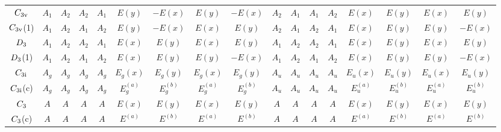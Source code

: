 \documentclass[fleqn,9pt,landscape]{jsarticle}
\begin{document}
\begin{table}[ht!]
\begin{center}
\begin{tabular}{c|cccccccc|cccccccc}
$C_{\rm 3v}$ & $A_{1}$ & $A_{2}$ & $A_{2}$ & $A_{1}$ & $E(y)$ & $-E(x)$ & $E(y)$ & $-E(x)$ & $A_{2}$ & $A_{1}$ & $A_{1}$ & $A_{2}$ & $E(x)$ & $E(y)$ & $E(x)$ & $E(y)$ \\
$C_{\rm 3v}$(1) & $A_{1}$ & $A_{2}$ & $A_{1}$ & $A_{2}$ & $E(y)$ & $-E(x)$ & $E(x)$ & $E(y)$ & $A_{2}$ & $A_{1}$ & $A_{2}$ & $A_{1}$ & $E(x)$ & $E(y)$ & $E(y)$ & $-E(x)$ \\
$D_{\rm 3}$ & $A_{1}$ & $A_{2}$ & $A_{2}$ & $A_{1}$ & $E(x)$ & $E(y)$ & $E(x)$ & $E(y)$ & $A_{1}$ & $A_{2}$ & $A_{2}$ & $A_{1}$ & $E(x)$ & $E(y)$ & $E(x)$ & $E(y)$ \\
$D_{\rm 3}$(1) & $A_{1}$ & $A_{2}$ & $A_{1}$ & $A_{2}$ & $E(x)$ & $E(y)$ & $E(y)$ & $-E(x)$ & $A_{1}$ & $A_{2}$ & $A_{1}$ & $A_{2}$ & $E(x)$ & $E(y)$ & $E(y)$ & $-E(x)$ \\
$C_{\rm 3i}$ & $A_{g}$ & $A_{g}$ & $A_{g}$ & $A_{g}$ & $E_{g}(x)$ & $E_{g}(y)$ & $E_{g}(x)$ & $E_{g}(y)$ & $A_{u}$ & $A_{u}$ & $A_{u}$ & $A_{u}$ & $E_{u}(x)$ & $E_{u}(y)$ & $E_{u}(x)$ & $E_{u}(y)$ \\
$C_{\rm 3i}$(c) & $A_{g}$ & $A_{g}$ & $A_{g}$ & $A_{g}$ & $E_{g}^{(a)}$ & $E_{g}^{(b)}$ & $E_{g}^{(a)}$ & $E_{g}^{(b)}$ & $A_{u}$ & $A_{u}$ & $A_{u}$ & $A_{u}$ & $E_{u}^{(a)}$ & $E_{u}^{(b)}$ & $E_{u}^{(a)}$ & $E_{u}^{(b)}$ \\
$C_{\rm 3}$ & $A$ & $A$ & $A$ & $A$ & $E(x)$ & $E(y)$ & $E(x)$ & $E(y)$ & $A$ & $A$ & $A$ & $A$ & $E(x)$ & $E(y)$ & $E(x)$ & $E(y)$ \\
$C_{\rm 3}$(c) & $A$ & $A$ & $A$ & $A$ & $E^{(a)}$ & $E^{(b)}$ & $E^{(a)}$ & $E^{(b)}$ & $A$ & $A$ & $A$ & $A$ & $E^{(a)}$ & $E^{(b)}$ & $E^{(a)}$ & $E^{(b)}$ \\
 \hline \hline
\end{tabular}
\end{center}
\end{table}
\newpage
\renewcommand{\arraystretch}{1.6}
\end{document}
